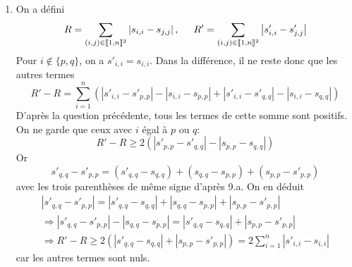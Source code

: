 \begin{enumerate}
 \item On a défini
\begin{displaymath}
R = \sum_{(i,j)\in \llbracket 1,n \rrbracket^2} \left|s_{i,i} - s_{j,j}\right|, \hspace{0.5cm}
R' = \sum_{(i,j)\in \llbracket 1,n \rrbracket^2} \left|s'_{i,i} - s'_{j,j}\right|
\end{displaymath}
Pour $i\notin\{p,q\}$, on a $s'_{i,i} = s_{i,i}$. Dans la différence, il ne reste donc que les autres termes
\begin{displaymath}
 R' - R =
\sum_{i=1}^{n}\left( |s'_{i,i} - s'_{p,p}| - |s_{i,i} - s_{p,p}| + |s'_{i,i} - s'_{q,q}| - |s_{i,i} - s_{q,q}|\right) 
\end{displaymath}
D'après la question précédente, tous les termes de cette somme sont positifs. On ne garde que ceux avec $i$ égal à $p$ ou $q$:
\begin{displaymath}
R' - R \geq   2\left( |s'_{p,p} - s'_{q,q}| - |s_{p,p} - s_{q,q}|\right) 
\end{displaymath}
Or
\begin{displaymath}
s'_{q,q} - s'_{p,p} = (s'_{q,q} - s_{q,q}) + (s_{q,q} - s_{p,p}) + (s_{p,p} - s'_{p,p}) 
\end{displaymath}
avec les trois parenthèses de même signe d'après 9.a. On en déduit
\begin{multline*}
|s'_{q,q} - s'_{p,p}| = |s'_{q,q} - s_{q,q}| + |s_{q,q} - s_{p,p}| + |s_{p,p} - s'_{p,p}| \\
\Rightarrow
|s'_{q,q} - s'_{p,p}| - |s_{q,q} - s_{p,p}| = |s'_{q,q} - s_{q,q}| + |s_{p,p} - s'_{p,p}| \\
\Rightarrow
R' - R \geq 2\left( |s'_{q,q} - s_{q,q}| + |s_{p,p} - s'_{p,p}|\right)
= 2 \sum_{i=1}^n |s'_{i,i} - s_{i,i}|
\end{multline*}
car les autres termes sont nuls.
\end{enumerate}


